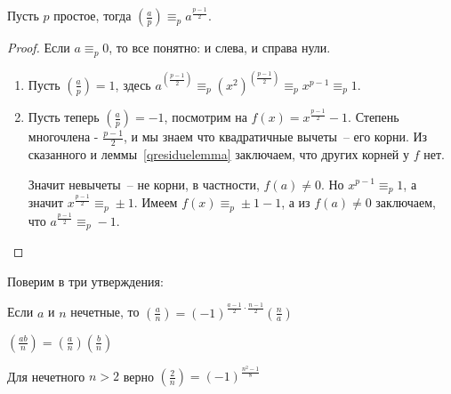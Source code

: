 \begin{theorem} \hypertarget{euler}{} Пусть $p$ простое, тогда $\left(\frac{a}{p}\right)\equiv_pa^{\frac{p-1}{2}}$.
\end{theorem}
\begin{proof}
Если $a\equiv_p 0$, то все понятно: и слева, и справа нули.
\begin{enumerate}
	\item Пусть $\left(\frac{a}{p}\right)=1$, здесь $a^{(\frac{p-1}{2})}\equiv_p \left(x^2\right)^{\left(\frac{p-1}{2}\right)}\equiv_p {x^{p-1}\equiv_p 1}$.
	\item Пусть теперь $\left(\frac{a}{p}\right)=-1$, посмотрим на $f(x)=x^{\frac{p-1}{2}}-1$. Степень многочлена - $\frac{p-1}{2}$, и мы знаем что квадратичные вычеты~-- его корни. Из сказанного и леммы~\ref{qresiduelemma} заключаем, что других корней у $f$ нет.

	Значит невычеты~-- не корни, в частности, $f(a) \neq 0$. Но $x^{p-1}\equiv_p 1$, а значит $x^{\frac{p-1}{2}}\equiv_p \pm1$. Имеем $f(x) \equiv_p \pm1 - 1$, а из $f(a) \neq 0$ заключаем, что $a^\frac{p-1}{2} \equiv_p -1$.
\end{enumerate}
\end{proof}

Поверим в три утверждения:
\begin{theorem} Если $a$ и $n$ нечетные, то
$\left(\frac{a}{n}\right)=(-1)^{\frac{a-1}{2}\cdot\frac{n-1}{2}}\left(\frac{n}{a}\right)$
\end{theorem}
\begin{theorem} \hypertarget{multiplicativity}{}
$\left(\frac{ab}{n}\right)=\left(\frac{a}{n}\right)\left(\frac{b}{n}\right)$
\end{theorem} \hypertarget{twojacobi}{}
\begin{theorem} Для нечетного $n>2$ верно $\left(\frac{2}{n}\right) = (-1)^\frac{n^2-1}{8}$
\end{theorem}

